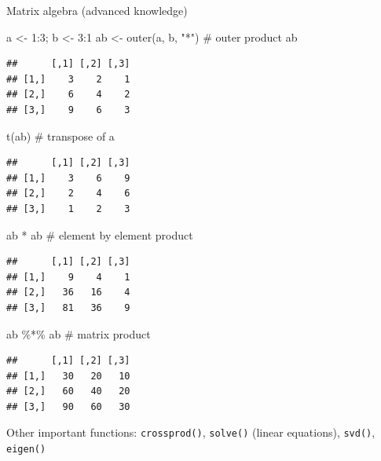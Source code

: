 \documentclass[
  9pt,
  ignorenonframetext,
]{beamer}
\newenvironment{Shaded}{\begin{snugshade}}{\end{snugshade}}
\newcommand{\CommentTok}[1]{\textcolor[rgb]{0.50,0.62,0.50}{#1}}
\newcommand{\DecValTok}[1]{\textcolor[rgb]{0.86,0.86,0.80}{#1}}
\newcommand{\KeywordTok}[1]{\textcolor[rgb]{0.94,0.87,0.69}{#1}}
\newcommand{\NormalTok}[1]{\textcolor[rgb]{0.80,0.80,0.80}{#1}}
\newcommand{\OperatorTok}[1]{\textcolor[rgb]{0.94,0.94,0.82}{#1}}
\newcommand{\StringTok}[1]{\textcolor[rgb]{0.80,0.58,0.58}{#1}}
\begin{document}
\begin{frame}[fragile]{Matrix algebra (advanced knowledge)}
\protect\hypertarget{matrix-algebra-advanced-knowledge}{}
\footnotesize

\begin{Shaded}
\begin{Highlighting}[]
\NormalTok{a \textless{}{-}}\StringTok{ }\DecValTok{1}\OperatorTok{:}\DecValTok{3}\NormalTok{; b \textless{}{-}}\StringTok{ }\DecValTok{3}\OperatorTok{:}\DecValTok{1}
\NormalTok{ab \textless{}{-}}\StringTok{ }\KeywordTok{outer}\NormalTok{(a, b, }\StringTok{"*"}\NormalTok{)    }\CommentTok{\# outer product}
\NormalTok{ab}
\end{Highlighting}
\end{Shaded}

\begin{verbatim}
##      [,1] [,2] [,3]
## [1,]    3    2    1
## [2,]    6    4    2
## [3,]    9    6    3
\end{verbatim}

\begin{Shaded}
\begin{Highlighting}[]
\KeywordTok{t}\NormalTok{(ab)           }\CommentTok{\# transpose of a}
\end{Highlighting}
\end{Shaded}

\begin{verbatim}
##      [,1] [,2] [,3]
## [1,]    3    6    9
## [2,]    2    4    6
## [3,]    1    2    3
\end{verbatim}

\begin{Shaded}
\begin{Highlighting}[]
\NormalTok{ab }\OperatorTok{*}\StringTok{ }\NormalTok{ab         }\CommentTok{\# element by element product}
\end{Highlighting}
\end{Shaded}

\begin{verbatim}
##      [,1] [,2] [,3]
## [1,]    9    4    1
## [2,]   36   16    4
## [3,]   81   36    9
\end{verbatim}

\begin{Shaded}
\begin{Highlighting}[]
\NormalTok{ab }\OperatorTok{\%*\%}\StringTok{ }\NormalTok{ab       }\CommentTok{\# matrix product}
\end{Highlighting}
\end{Shaded}

\begin{verbatim}
##      [,1] [,2] [,3]
## [1,]   30   20   10
## [2,]   60   40   20
## [3,]   90   60   30
\end{verbatim}

\vfill

\begin{block}{}
\protect\hypertarget{section-2}{}
Other important functions: \texttt{crossprod()}, \texttt{solve()}
(linear equations), \texttt{svd()}, \texttt{eigen()}
\end{block}
\end{frame}
\end{document}

